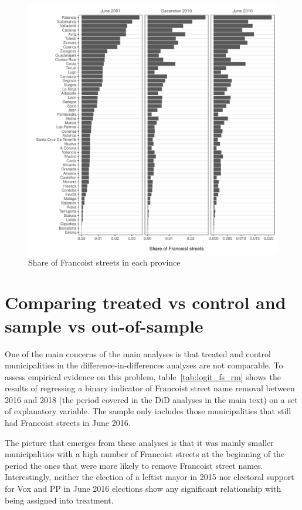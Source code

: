 \documentclass[12pt, titlepage]{article}
\begin{document}
\begin{figure}[htb!]
\centering

  \includegraphics[width = \textwidth]{img/fs_by_prov}

  \caption{Share of Francoist streets in each province}\label{fig:fs_by_prov}

\end{figure}

\clearpage
\section{Comparing treated vs control and sample vs out-of-sample}\label{app:treated_vs_control_vs_outsample}

One of the main concerns of the main analyses is that treated and control municipalities in the difference-in-differences analyses are not comparable.
To assess empirical evidence on this problem, table~\ref{tab:logit_fs_rm} shows the results of regressing a binary indicator of Francoist street name removal between 2016 and 2018 (the period covered in the DiD analyses in the main text) on a set of explanatory variable.
The sample only includes those municipalities that still had Francoist streets in June 2016.



The picture that emerges from these analyses is that it was mainly smaller municipalities with a high number of Francoist streets at the beginning of the period the ones that were more likely to remove Francoist street names.
Interestingly, neither the election of a leftist mayor in 2015 nor electoral support for Vox and PP in June 2016 elections show any significant relationship with being assigned into treatment.
\end{document}
